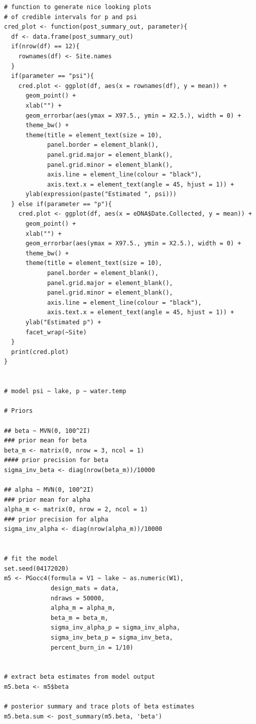 \documentclass[12pt]{article}\usepackage[]{graphicx}\usepackage[]{color}
\makeatletter
\newenvironment{kframe}{%
 \def\at@end@of@kframe{}%
 \ifinner\ifhmode%
  \def\at@end@of@kframe{\end{minipage}}%
  \begin{minipage}{\columnwidth}%
 \fi\fi%
 \def\FrameCommand##1{\hskip\@totalleftmargin \hskip-\fboxsep
 \colorbox{shadecolor}{##1}\hskip-\fboxsep
     \hskip-\linewidth \hskip-\@totalleftmargin \hskip\columnwidth}%
 \MakeFramed {\advance\hsize-\width
   \@totalleftmargin\z@ \linewidth\hsize
   \@setminipage}}%
 {\par\unskip\endMakeFramed%
 \at@end@of@kframe}
\newenvironment{knitrout}{}{} %
\newenvironment{kframe}{%
 \def\at@end@of@kframe{}%
 \ifinner\ifhmode%
  \def\at@end@of@kframe{\end{minipage}}%
  \begin{minipage}{\columnwidth}%
 \fi\fi%
 \def\FrameCommand##1{\hskip\@totalleftmargin \hskip-\fboxsep
 \colorbox{shadecolor}{##1}\hskip-\fboxsep
     \hskip-\linewidth \hskip-\@totalleftmargin \hskip\columnwidth}%
 \MakeFramed {\advance\hsize-\width
   \@totalleftmargin\z@ \linewidth\hsize
   \@setminipage}}%
 {\par\unskip\endMakeFramed%
 \at@end@of@kframe}
\newenvironment{knitrout}{}{} %
\makeatother
\begin{document}
\begin{small}
\begin{knitrout}
\begin{kframe}
\begin{verbatim}
# function to generate nice looking plots
# of credible intervals for p and psi
cred_plot <- function(post_summary_out, parameter){
  df <- data.frame(post_summary_out)
  if(nrow(df) == 12){
    rownames(df) <- Site.names
  } 
  if(parameter == "psi"){
    cred.plot <- ggplot(df, aes(x = rownames(df), y = mean)) + 
      geom_point() + 
      xlab("") + 
      geom_errorbar(aes(ymax = X97.5., ymin = X2.5.), width = 0) + 
      theme_bw() + 
      theme(title = element_text(size = 10),
            panel.border = element_blank(), 
            panel.grid.major = element_blank(),
            panel.grid.minor = element_blank(), 
            axis.line = element_line(colour = "black"), 
            axis.text.x = element_text(angle = 45, hjust = 1)) +
      ylab(expression(paste("Estimated ", psi))) 
  } else if(parameter == "p"){
    cred.plot <- ggplot(df, aes(x = eDNA$Date.Collected, y = mean)) + 
      geom_point() + 
      xlab("") + 
      geom_errorbar(aes(ymax = X97.5., ymin = X2.5.), width = 0) + 
      theme_bw() + 
      theme(title = element_text(size = 10),
            panel.border = element_blank(), 
            panel.grid.major = element_blank(),
            panel.grid.minor = element_blank(), 
            axis.line = element_line(colour = "black"), 
            axis.text.x = element_text(angle = 45, hjust = 1)) + 
      ylab("Estimated p") + 
      facet_wrap(~Site) 
  }
  print(cred.plot)
}
  

# model psi ~ lake, p ~ water.temp

# Priors 

## beta ~ MVN(0, 100^2I)
### prior mean for beta
beta_m <- matrix(0, nrow = 3, ncol = 1) 
#### prior precision for beta
sigma_inv_beta <- diag(nrow(beta_m))/10000 

## alpha ~ MVN(0, 100^2I)
### prior mean for alpha
alpha_m <- matrix(0, nrow = 2, ncol = 1) 
### prior precision for alpha
sigma_inv_alpha <- diag(nrow(alpha_m))/10000 


# fit the model 
set.seed(04172020)
m5 <- PGocc4(formula = V1 ~ lake ~ as.numeric(W1), 
             design_mats = data, 
             ndraws = 50000, 
             alpha_m = alpha_m, 
             beta_m = beta_m, 
             sigma_inv_alpha_p = sigma_inv_alpha, 
             sigma_inv_beta_p = sigma_inv_beta, 
             percent_burn_in = 1/10)


# extract beta estimates from model output
m5.beta <- m5$beta

# posterior summary and trace plots of beta estimates
m5.beta.sum <- post_summary(m5.beta, 'beta')



\end{verbatim}
\end{kframe}
\end{knitrout}
\end{small}
\end{document}

